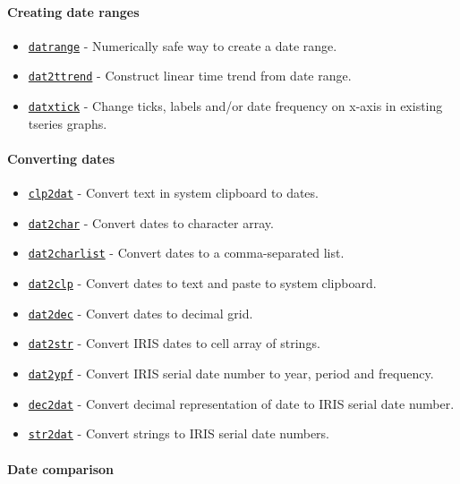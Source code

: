 \paragraph{Creating date ranges}

\begin{itemize}
\itemsep1pt\parskip0pt
\item
  \href{dates/datrange}{\texttt{datrange}} - Numerically safe way to
  create a date range.
\item
  \href{dates/dat2ttrend}{\texttt{dat2ttrend}} - Construct linear time
  trend from date range.
\item
  \href{dates/datxtick}{\texttt{datxtick}} - Change ticks, labels and/or
  date frequency on x-axis in existing tseries graphs.
\end{itemize}

\paragraph{Converting dates}

\begin{itemize}
\itemsep1pt\parskip0pt
\item
  \href{dates/clp2dat}{\texttt{clp2dat}} - Convert text in system
  clipboard to dates.
\item
  \href{dates/dat2char}{\texttt{dat2char}} - Convert dates to character
  array.
\item
  \href{dates/dat2charlist}{\texttt{dat2charlist}} - Convert dates to a
  comma-separated list.
\item
  \href{dates/dat2clp}{\texttt{dat2clp}} - Convert dates to text and
  paste to system clipboard.
\item
  \href{dates/dat2dec}{\texttt{dat2dec}} - Convert dates to decimal
  grid.
\item
  \href{dates/dat2str}{\texttt{dat2str}} - Convert IRIS dates to cell
  array of strings.
\item
  \href{dates/dat2ypf}{\texttt{dat2ypf}} - Convert IRIS serial date
  number to year, period and frequency.
\item
  \href{dates/dec2dat}{\texttt{dec2dat}} - Convert decimal
  representation of date to IRIS serial date number.
\item
  \href{dates/str2dat}{\texttt{str2dat}} - Convert strings to IRIS
  serial date numbers.
\end{itemize}

\paragraph{Date comparison}

